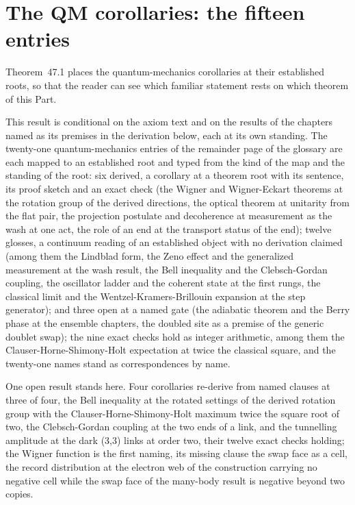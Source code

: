 \section{The QM corollaries: the fifteen entries}\label{mod:II-9-qm-corollaries-the-fifteen-entries}
\label{narr:open:2-9}Theorem~47.1 places the quantum-mechanics corollaries at their established roots, so that the reader can see which familiar statement rests on which theorem of this Part.
\begin{chconditional}\label{box:II-9-qm-corollaries-the-fifteen-entries:1}
This result is conditional on the axiom text and on the results of the chapters named as its premises in the derivation below, each at its own standing.
The twenty-one quantum-mechanics entries of the remainder page of the glossary are each mapped to an established root and typed from the kind of the map and the standing of the root: six derived, a corollary at a theorem root with its sentence, its proof sketch and an exact check (the Wigner and Wigner-Eckart theorems at the rotation group of the derived directions, the optical theorem at unitarity from the flat pair, the projection postulate and decoherence at measurement as the wash at one act, the role of an end at the transport status of the end); twelve glosses, a continuum reading of an established object with no derivation claimed (among them the Lindblad form, the Zeno effect and the generalized measurement at the wash result, the Bell inequality and the Clebsch-Gordan coupling, the oscillator ladder and the coherent state at the first rungs, the classical limit and the Wentzel-Kramers-Brillouin expansion at the step generator); and three open at a named gate (the adiabatic theorem and the Berry phase at the ensemble chapters, the doubled site as a premise of the generic doublet swap); the nine exact checks hold as integer arithmetic, among them the Clauser-Horne-Shimony-Holt expectation at twice the classical square, and the twenty-one names stand as correspondences by name.
\end{chconditional}
One open result stands here. Four corollaries re-derive from named clauses at three of four, the Bell inequality at the rotated settings of the derived rotation group with the Clauser-Horne-Shimony-Holt maximum twice the square root of two, the Clebsch-Gordan coupling at the two ends of a link, and the tunnelling amplitude at the dark (3,3) links at order two, their twelve exact checks holding; the Wigner function is the first naming, its missing clause the swap face as a cell, the record distribution at the electron web of the construction carrying no negative cell while the swap face of the many-body result is negative beyond two copies.
